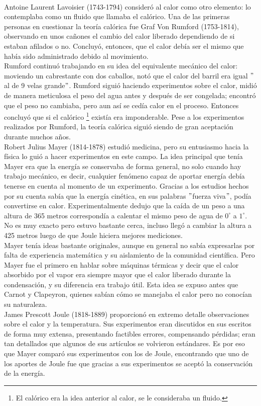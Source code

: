 \\
Antoine Laurent Lavoisier (1743-1794) consideró al calor como otro elemento: lo contemplaba como un fluido que llamaba el calórico. Una de las primeras personas en cuestionar la teoría calórica fue Graf Von Rumford (1753-1814), observando en unos cañones el cambio del calor liberado dependiendo de si estaban afilados o no. Concluyó, entonces, que el calor debía ser el mismo que había sido administrado debido al movimiento.
\\
Rumford continuó trabajando en su idea del equivalente mecánico del calor: moviendo un cabrestante con dos caballos, notó que el calor del barril era igual $"$al de 9 velas grande$"$. Rumford siguió haciendo experimentos sobre el calor, midió de manera meticulosa el peso del agua antes y después de ser congelada; encontró que el peso no cambiaba, pero aun así se cedía calor en el proceso. Entonces concluyó que si el calórico \footnote{El calórico era la idea anterior al calor, se le consideraba un fluido.} existía era imponderable. Pese a los experimentos realizados por Rumford, la teoría calórica siguió siendo de gran aceptación durante muchos años.  	
\\
Robert Julius Mayer (1814-1878) estudió medicina, pero su entusiasmo hacia la física lo guió a hacer experimentos en este campo. La idea principal que tenía Mayer era que la energía se conservaba de forma general, no solo cuando hay trabajo mecánico, es decir, cualquier fenómeno capaz de aportar energía debía tenerse en cuenta al momento de un experimento. Gracias a los estudios hechos por su cuenta sabía que la energía cinética, en sus palabras $"$fuerza viva$"$, podía convertirse en calor. Experimentalmente dedujo que la caída de un peso a una altura de 365 metros correspondía a calentar el mismo peso de agua de $0^{\circ}$ a $1^{\circ}$. No es muy exacto pero estuvo bastante cerca, incluso llegó a cambiar la altura a 425 metros luego de que Joule hiciera mejores mediciones.
\\
Mayer tenía ideas bastante originales, aunque en general no sabía expresarlas por falta de experiencia matemática y su aislamiento de la comunidad científica. Pero Mayer fue el primero en hablar sobre máquinas térmicas y decir que el calor absorbido por el vapor era siempre mayor que el calor liberado durante la condensación, y su diferencia era trabajo útil. Esta idea se expuso antes que Carnot y Clapeyron, quienes sabían cómo se manejaba el calor pero no conocían su naturaleza.
\\
James Prescott Joule (1818-1889) proporcionó en extremo detalle observaciones sobre el calor y la temperatura. Sus experimentos eran discutidos en sus escritos de forma muy extensa, presentando factibles errores, compensando pérdidas; eran tan detallados que algunos de sus artículos se volvieron estándares. Es por eso que Mayer comparó sus experimentos con los de Joule, encontrando que uno de los aportes de Joule fue que gracias a sus experimentos se aceptó la conservación de la energía.
